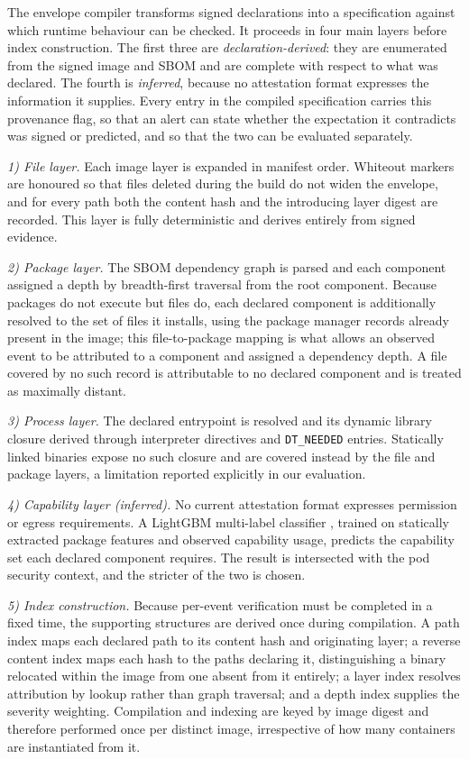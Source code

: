 \documentclass[conference]{IEEEtran}
\begin{document}
The envelope compiler transforms signed declarations into a
specification against which runtime behaviour can be checked. It
proceeds in four main layers before index construction. The first three
are \emph{declaration-derived}: they are enumerated from the signed
image and SBOM and are complete with respect to what was declared. The
fourth is \emph{inferred}, because no attestation format expresses the
information it supplies. Every entry in the compiled specification
carries this provenance flag, so that an alert can state whether the
expectation it contradicts was signed or predicted, and so that the two
can be evaluated separately.

\textit{1) File layer.} Each image layer is expanded in manifest order.
Whiteout markers are honoured so that files deleted during the build do
not widen the envelope, and for every path both the content hash and the
introducing layer digest are recorded. This layer is fully deterministic
and derives entirely from signed evidence.

\textit{2) Package layer.} The SBOM dependency graph is parsed and each
component assigned a depth by breadth-first traversal from the root
component. Because packages do not execute but files do, each declared
component is additionally resolved to the set of files it installs,
using the package manager records already present in the image; this
file-to-package mapping is what allows an observed event to be
attributed to a component and assigned a dependency depth. A file
covered by no such record is attributable to no declared component and
is treated as maximally distant.

\textit{3) Process layer.} The declared entrypoint is resolved and its
dynamic library closure derived through interpreter directives and
\texttt{DT\_NEEDED} entries. Statically linked binaries expose no such
closure and are covered instead by the file and package layers, a
limitation reported explicitly in our evaluation.

\textit{4) Capability layer (inferred).} No current attestation format
expresses permission or egress requirements. A LightGBM multi-label
classifier
\cite{lightgbm2017}, trained on statically extracted package features
and observed capability usage, predicts the capability set each declared
component requires. The result is intersected with the pod security
context, and the stricter of the two is chosen.

\textit{5) Index construction.} Because per-event verification must be
completed in a fixed time, the supporting structures are derived once
during compilation. A path index maps each declared path to its content
hash and originating layer; a reverse content index maps each hash to
the paths declaring it, distinguishing a binary relocated within the
image from one absent from it entirely; a layer index resolves
attribution by lookup rather than graph traversal; and a depth index
supplies the severity weighting. Compilation and indexing are keyed by
image digest and therefore performed once per distinct image,
irrespective of how many containers are instantiated from it.
\end{document}
